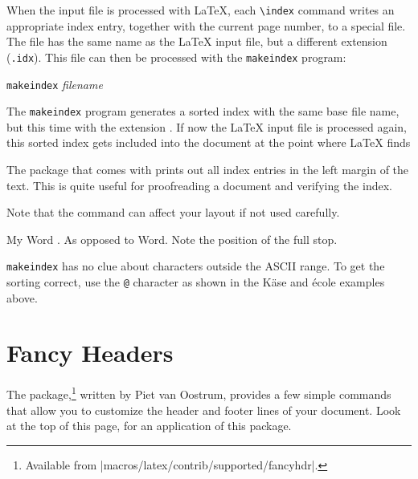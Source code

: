 When the input file is processed with \LaTeX{}, each \verb|\index|
command writes an appropriate index entry, together with the current
page number, to a special file. The file has the same name as the
\LaTeX{} input file, but a different extension (\verb|.idx|). This
 file can then be processed with the \texttt{makeindex}
program:

\begin{lscommand}
  \texttt{makeindex} \emph{filename}
\end{lscommand}
The \texttt{makeindex} program generates a sorted index with the same base
file name, but this time with the extension . If now the
\LaTeX{} input file is processed again, this sorted index gets
included into the document at the point where \LaTeX{} finds
\begin{lscommand}
\end{lscommand}

The  package that comes with \LaTeXe{} prints out all
index entries in the left margin of the text. This is quite useful for
proofreading a document and verifying the index.

Note that the  command can affect your layout if not used carefully.

\begin{example}
My Word . As opposed
to Word. Note the
position of the full stop.
\end{example}

\texttt{makeindex} has no clue about characters outside the ASCII range. To
get the sorting correct, use the \verb|@| character as shown in the K\"ase
and \'ecole examples above.

\section{Fancy Headers}
\label{sec:fancy}

The  package,\footnote{Available from
  \CTAN|macros/latex/contrib/supported/fancyhdr|.} written by
Piet van Oostrum, provides a few simple commands that allow you to
customize the header and footer lines of your document.  Look
at the top of this page, for an application of this
package.

